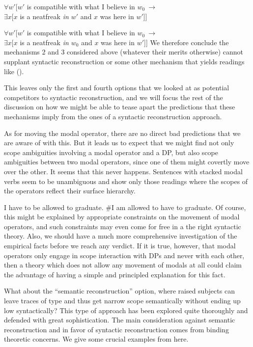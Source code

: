 \ex $\forall w'[w'$ is compatible with what I believe in $w_{0}\ \rightarrow$ \\
\null\hfill$\exists x[x$ is a neatfreak \emph{in $w'$} and $x$ was here in $w'$]] \xe

\ex $\forall w'[w'$ is compatible with what I believe in $w_{0}\ \rightarrow$ \\
\null\hfill$\exists x[x$ is a neatfreak \emph{in $w_{0}$} and $x$ was here in $w'$]] \xe
%
We therefore conclude the mechanisms 2 and 3 considered above (whatever their
merits otherwise) cannot supplant syntactic reconstruction or some other
mechanism that yields readings like (\blastx).

This leaves only the first and fourth options that we looked at as potential
competitors to syntactic reconstruction, and we will focus the rest of the
discussion on how we might be able to tease apart the predictions that these
mechanisms imply from the ones of a syntactic reconstruction approach.

As for moving the modal operator, there are no direct bad predictions that we
are aware of with this. But it leads us to expect that we might find not only
scope ambiguities involving a modal operator and a DP, but also scope
ambiguities between two modal operators, since one of them might covertly move
over the other. It seems that this never happens. Sentences with stacked modal
verbs seem to be unambiguous and show only those readings where the scopes of
the operators reflect their surface hierarchy.

\pex
\a I have to be allowed to graduate.
\a \#I am allowed to have to graduate.
\xe
%
%
Of course, this might be explained by appropriate constraints on the movement of
modal operators, and such constraints may even come for free in a the right
syntactic theory. Also, we should have a much more comprehensive investigation
of the empirical facts before we reach any verdict. If it is true, however, that
modal operators only engage in scope interaction with DPs and never with each
other, then a theory which does not allow any movement of modals at all could
claim the advantage of having a simple and principled explanation for this fact.

What about the ``semantic reconstruction'' option, where raised subjects can
leave traces of type  and thus get narrow scope
semantically without ending up low syntactically? This type of approach has been
explored quite thoroughly and defended with great sophistication. The main
consideration against semantic reconstruction and in favor of syntactic
reconstruction comes from binding theoretic concerns. We give some crucial
examples from \cite{fox:2000} here.

